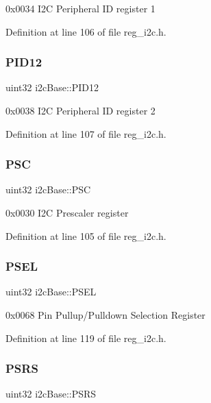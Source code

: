 0x0034 I2C Peripheral ID register 1 

Definition at line 106 of file reg\+\_\+i2c.\+h.

\mbox{\label{structi2cBase_af58e5e7caf8f739476a1e3a379d6e22d}} 
\subsubsection{\texorpdfstring{P\+I\+D12}{PID12}}
{\footnotesize\ttfamily uint32 i2c\+Base\+::\+P\+I\+D12}

0x0038 I2C Peripheral ID register 2 

Definition at line 107 of file reg\+\_\+i2c.\+h.

\mbox{\label{structi2cBase_a7e4224de46a1e3bf76173fad706e234a}} 
\subsubsection{\texorpdfstring{P\+SC}{PSC}}
{\footnotesize\ttfamily uint32 i2c\+Base\+::\+P\+SC}

0x0030 I2C Prescaler register 

Definition at line 105 of file reg\+\_\+i2c.\+h.

\mbox{\label{structi2cBase_a08dd81b32b1cd0bf8cc74a010019f130}} 
\subsubsection{\texorpdfstring{P\+S\+EL}{PSEL}}
{\footnotesize\ttfamily uint32 i2c\+Base\+::\+P\+S\+EL}

0x0068 Pin Pullup/\+Pulldown Selection Register 

Definition at line 119 of file reg\+\_\+i2c.\+h.

\mbox{\label{structi2cBase_a7b4fc475a2d9d59c0e6252bec08b983a}} 
\subsubsection{\texorpdfstring{P\+S\+RS}{PSRS}}
{\footnotesize\ttfamily uint32 i2c\+Base\+::\+P\+S\+RS}

